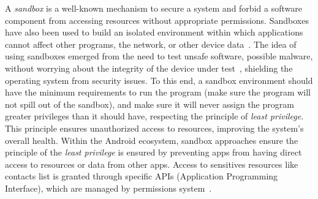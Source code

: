 A \emph{sandbox}
is a well-known mechanism to secure a system and forbid a software component from accessing
resources without appropriate permissions. Sandboxes have also been used to build an isolated
environment within which applications cannot affect other programs, the network, or other device data~\cite{DBLP:journals/peerj-cs/MaassSCS16}. The idea of using sandboxes emerged from the
need to test unsafe software, possible malware, without worrying about the integrity of the
device under test~\cite{DBLP:conf/esorics/BordoniCS17}, shielding the operating system from security issues.
To this end, a sandbox environment should have the minimum requirements to run the
program (make sure the program will not spill out of the sandbox), and make sure it will never
assign the program greater privileges than it should have, respecting the principle of
\emph{least privilege}. This principle ensures unauthorized access to resources,
improving the system's overall health. Within the Android ecosystem, sandbox approaches ensure the principle
of the \emph{least privilege} is ensured by preventing apps from having direct access to resources or data from other apps. Access to sensitives resources
like contacts list is granted through specific APIs (Application Programming Interface),
which are managed by permissions system~\cite{DBLP:journals/corr/abs-2109-06613}. 





